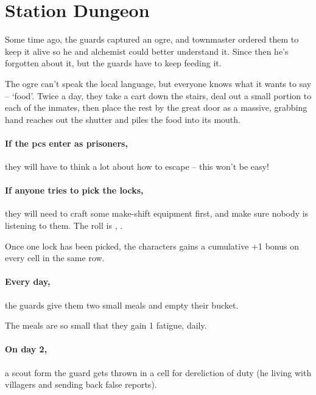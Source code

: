 \prisonMap

\section{Station Dungeon}
\label{stationDungeon}

\begin{multicols}{2}

\begin{exampletext}
  Some time ago, the guards captured an ogre, and \gls{townmaster} ordered them to keep it alive so he and \gls{alchemist} could better understand it.
  Since then he's forgotten about it, but the guards have to keep feeding it.

  The ogre can't speak the local language, but everyone knows what it wants to say -- `food'.
  Twice a day, they take a cart down the stairs, deal out a small portion to each of the inmates, then place the rest by the great door as a massive, grabbing hand reaches out the shutter and piles the food into its mouth.
\end{exampletext}

\paragraph{If the \glspl{pc} enter as prisoners,}
they will have to think a lot about how to escape -- this won't be easy!

\paragraph{If anyone tries to pick the locks,}
they will need to craft some make-shift equipment first, and make sure nobody is listening to them.
The roll is , \tn[12].

Once one lock has been picked, the characters gains a cumulative +1 bonus on every cell in the same row.

\paragraph{Every day,}
the guards give them two small meals and empty their bucket.

The meals are so small that they gain 1 \gls{fatigue}, daily.

\paragraph{On day 2,}
a scout form the \gls{guard} gets thrown in a cell for dereliction of duty (he living with villagers and sending back false reports).


\end{multicols}
